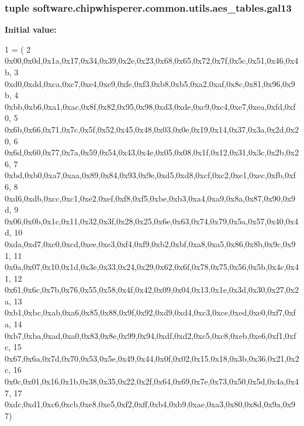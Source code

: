 \subsubsection[{gal13}]{\setlength{\rightskip}{0pt plus 5cm}tuple software.\+chipwhisperer.\+common.\+utils.\+aes\+\_\+tables.\+gal13}\label{namespacesoftware_1_1chipwhisperer_1_1common_1_1utils_1_1aes__tables_a889f148d039807d1f829cd3c63058d94}
{\bfseries Initial value\+:}
\begin{DoxyCode}
1 = (
2 0x00,0x0d,0x1a,0x17,0x34,0x39,0x2e,0x23,0x68,0x65,0x72,0x7f,0x5c,0x51,0x46,0x4b,
3 0xd0,0xdd,0xca,0xc7,0xe4,0xe9,0xfe,0xf3,0xb8,0xb5,0xa2,0xaf,0x8c,0x81,0x96,0x9b,
4 0xbb,0xb6,0xa1,0xac,0x8f,0x82,0x95,0x98,0xd3,0xde,0xc9,0xc4,0xe7,0xea,0xfd,0xf0,
5 0x6b,0x66,0x71,0x7c,0x5f,0x52,0x45,0x48,0x03,0x0e,0x19,0x14,0x37,0x3a,0x2d,0x20,
6 0x6d,0x60,0x77,0x7a,0x59,0x54,0x43,0x4e,0x05,0x08,0x1f,0x12,0x31,0x3c,0x2b,0x26,
7 0xbd,0xb0,0xa7,0xaa,0x89,0x84,0x93,0x9e,0xd5,0xd8,0xcf,0xc2,0xe1,0xec,0xfb,0xf6,
8 0xd6,0xdb,0xcc,0xc1,0xe2,0xef,0xf8,0xf5,0xbe,0xb3,0xa4,0xa9,0x8a,0x87,0x90,0x9d,
9 0x06,0x0b,0x1c,0x11,0x32,0x3f,0x28,0x25,0x6e,0x63,0x74,0x79,0x5a,0x57,0x40,0x4d,
10 0xda,0xd7,0xc0,0xcd,0xee,0xe3,0xf4,0xf9,0xb2,0xbf,0xa8,0xa5,0x86,0x8b,0x9c,0x91,
11 0x0a,0x07,0x10,0x1d,0x3e,0x33,0x24,0x29,0x62,0x6f,0x78,0x75,0x56,0x5b,0x4c,0x41,
12 0x61,0x6c,0x7b,0x76,0x55,0x58,0x4f,0x42,0x09,0x04,0x13,0x1e,0x3d,0x30,0x27,0x2a,
13 0xb1,0xbc,0xab,0xa6,0x85,0x88,0x9f,0x92,0xd9,0xd4,0xc3,0xce,0xed,0xe0,0xf7,0xfa,
14 0xb7,0xba,0xad,0xa0,0x83,0x8e,0x99,0x94,0xdf,0xd2,0xc5,0xc8,0xeb,0xe6,0xf1,0xfc,
15 0x67,0x6a,0x7d,0x70,0x53,0x5e,0x49,0x44,0x0f,0x02,0x15,0x18,0x3b,0x36,0x21,0x2c,
16 0x0c,0x01,0x16,0x1b,0x38,0x35,0x22,0x2f,0x64,0x69,0x7e,0x73,0x50,0x5d,0x4a,0x47,
17 0xdc,0xd1,0xc6,0xcb,0xe8,0xe5,0xf2,0xff,0xb4,0xb9,0xae,0xa3,0x80,0x8d,0x9a,0x97)
\end{DoxyCode}
\hypertarget{namespacesoftware_1_1chipwhisperer_1_1common_1_1utils_1_1aes__tables_a0ca46da7cf1001b0a8c3a9e441e6ac43}{}
